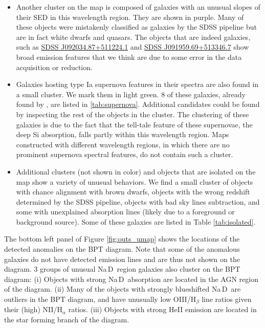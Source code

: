 \documentclass[fleqn,usenatbib]{mnras}
\def\nad{\mbox{Na\hspace{.5pt}{I}\,D}}
\begin{document}
{\begin{itemize}
\item Another cluster on the map is composed of galaxies with an unusual slopes of their SED in this wavelength region. They are shown in purple. Many of these objects  were mistakenly classified as galaxies by the SDSS pipeline but are in fact white dwarfs and quasars. The objects that are indeed galaxies, such as \href{http://skyserver.sdss.org/dr14/en/tools/explore/summary.aspx?sid=863651577993390080&apid=}{SDSS J092034.87+511224.1} and \href{http://skyserver.sdss.org/dr14/en/tools/explore/summary.aspx?sid=863649928725948416&apid=}{SDSS J091959.69+513346.7} show  broad emission features that we think are due to some error in the data acquisition or reduction.


\item Galaxies hosting type Ia supernova features in their spectra are also found in a small cluster. We mark them in light green. 8 of these galaxies, already found  by \citet{graur13}, are listed in \ref{tab:supernova}. Additional candidates could be found by inspecting the rest of the objects in the cluster.  The clustering of these galaxies  is  due to the fact that the tell-tale feature of these supernovae, the deep Si absorption, falls partly within this wavelength region. Maps constructed with different wavelength regions, in which there are no prominent supernova spectral features, do not contain such a cluster.


\item Additional clusters (not shown in color) and objects that are isolated on the map show a variety of unusual behaviors. We find a small  cluster of objects with chance alignment with brown dwarfs, objects with the wrong redshift determined by the SDSS pipeline, objects with bad sky lines subtraction, and some with unexplained absorption lines (likely due to a foreground or background source).  Some of these galaxies are listed in Table \ref{tab:isolated}.



\end{itemize}

The bottom left panel of Figure \ref{fig:outs_umap} shows the locations of the detected anomalies on the BPT diagram. Note that some of the anomalous galaxies do not have detected emission lines and are thus not shown on the diagram. 3 groups of unusual \nad\ region galaxies also cluster on the BPT diagram: (i) Objects with strong \nad\ absorption are located in the AGN region of the diagram. (ii) Many of the objects with strongly blueshifted \nad\ are outliers in the BPT diagram, and have unusually low OIII/H$_{\beta}$ line ratios given their (high) NII/H$_{\alpha}$ ratios. (iii) Objects with strong HeII emission are located in the star forming branch of the diagram.

}
\end{document}
